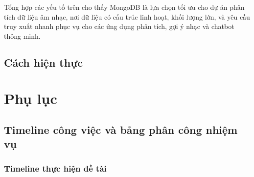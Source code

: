 \documentclass{../hcmut-report}
\begin{document}
Tổng hợp các yếu tố trên cho thấy MongoDB là lựa chọn tối ưu cho dự án phân tích dữ liệu âm nhạc, nơi dữ liệu có cấu trúc linh hoạt, khối lượng lớn, và yêu cầu truy xuất nhanh phục vụ cho các ứng dụng phân tích, gợi ý nhạc và chatbot thông minh.
\subsection{Cách hiện thực}




\section{Phụ lục}

\subsection{Timeline công việc và bảng phân công nhiệm vụ}
\subsubsection{Timeline thực hiện đề tài}
\end{document}
